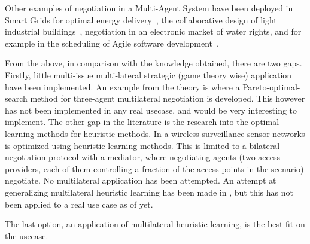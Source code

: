 Other examples of negotiation in a Multi-Agent System have been deployed in Smart Grids for optimal energy delivery~\citep{pipattanasomporn2009multi}, the collaborative design of light industrial buildings~\citep{anumba2003negotiation}, negotiation in an electronic market of water rights, and for example in the scheduling of Agile software development~\citep{rabelo1999multi}. 

From the above, in comparison with the knowledge obtained, there are two gaps. Firstly, little multi-issue multi-lateral strategic (game theory wise) application have been implemented. An example from the theory is \citet{wu2009efficient} where a Pareto-optimal-search method for three-agent multilateral negotiation is developed. This however has not been implemented in any real usecase, and would be very interesting to implement. The other gap in the literature is the research into the optimal learning methods for heuristic methods. In \citet{de2015automated} a wireless surveillance sensor networks is optimized using heuristic learning methods. This is limited to a bilateral negotiation protocol with a mediator, where negotiating agents (two access providers, each of them controlling a fraction of the access points in the scenario) negotiate. No multilateral application has been attempted. An attempt at generalizing multilateral heuristic learning has been made in \citet{beheshti2014homan}, but this has not been applied to a real use case as of yet.

The last option, an application of multilateral heuristic learning, is the best fit on the usecase.

